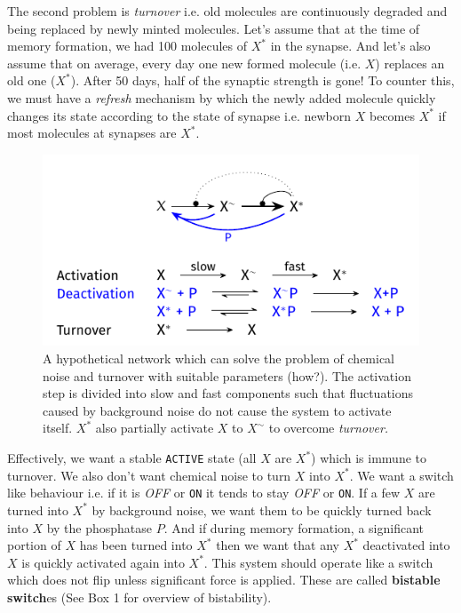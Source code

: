 \documentclass[]{resonance}
\begin{document}
The second problem is \textit{turnover} i.e. old molecules are continuously
degraded and being replaced by newly minted molecules. Let's assume that at the
time of memory formation, we had 100 molecules of $X^*$ in the synapse. And
let's also assume that on average, every day one new formed molecule (i.e. $X$)
replaces an old one ($X^*$).  After 50 days, half of the synaptic strength is
gone! To counter this, we must have a \textit{refresh} mechanism by which the
newly added molecule quickly changes its state according to the state of synapse
i.e. newborn $X$ becomes $X^*$ if most molecules at synapses are $X^*$.

\begin{figure}[b!]
\centering
\caption{A hypothetical network which can solve the problem of chemical noise and
    turnover with suitable parameters (how?). The activation step is divided
    into slow and fast components such that fluctuations caused by background
    noise do not cause the system to activate itself. $X^*$ also partially activate
    $X$ to $X^\sim$ to overcome \textit{turnover.}
}\label{fig:model_bistable}
\includegraphics[width=\linewidth]{./fig_model_b.pdf}
\end{figure}

Effectively, we want a stable \texttt{ACTIVE} state (all $X$ are $X^*$) which is
immune to turnover. We also don't want chemical noise to turn $X$ into $X^*$.
We want a switch like behaviour i.e. if it is \textit{OFF} or \texttt{ON} it
tends to stay \textit{OFF} or \texttt{ON}. If a few $X$ are turned into $X^*$ by
background noise, we want them to be quickly turned back into $X$ by the
phosphatase $P$. And if during memory formation, a significant portion of $X$
has been turned into $X^*$ then we want that any $X^*$ deactivated into $X$ is
quickly activated again into $X^*$. This system should operate like a switch
which does not flip unless significant force is applied. These are called
\textbf{bistable switch}es (See Box 1 for overview of bistability). 
\end{document}
